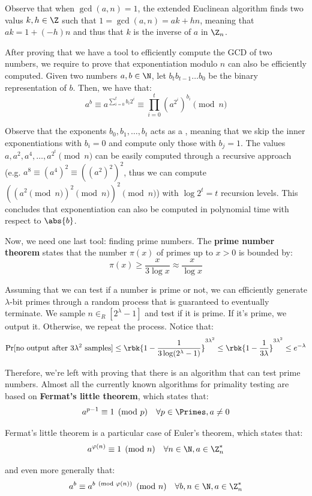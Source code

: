\documentclass[a4paper, 12pt]{report}
\begin{document}
    Observe that when $\gcd(a,n) = 1$, the extended Euclinean algorithm finds two valus $k,h \in \Z$ such that $1 = \gcd(a,n) = ak+hn$, meaning that $ak = 1+(-h)n$ and thus that $k$ is the inverse of $a$ in $\Z_n$.

    After proving that we have a tool to efficiently compute the GCD of two numbers, we require to prove that exponentiation modulo $n$ can also be efficiently computed. Given two numbers $a,b \in \N$, let $b_tb_{t-1}\ldots b_0$ be the binary representation of $b$. Then, we have that:
    \[a^b \equiv a^{\sum_{i = 0}^t b_i 2^i} \equiv \prod_{i = 0}^t (a^{2^i})^{b_i} \pmod n\]

    Observe that the exponents $b_0, b_1, \ldots, b_t$ acts as a , meaning that we skip the inner exponentiations with $b_i = 0$ and compute only those with $b_j = 1$. The values $a, a^2, a^4, \ldots, a^{2^t} \pmod n$ can be easily computed through a recursive approach (e.g. $a^8 \equiv (a^4)^2 \equiv ((a^2)^2)^2$, thus we can compute $((a^2 \pmod n)^2 \pmod n)^2 \pmod n$) with $\log 2^t = t$ recursion levels. This concludes that exponentiation can also be computed in polynomial time with respect to $\abs{b}$.

    Now, we need one last tool: finding prime numbers. The \textbf{prime number theorem} states that the number $\pi(x)$ of primes up to $x > 0$ is bounded by:
    \[\pi(x) \geq \frac{x}{3 \log x} \approx \frac{x}{\log x}\] 

    Assuming that we can test if a number is prime or not, we can efficiently generate $\lambda$-bit primes through a random process that is guaranteed to eventually terminate. We sample $n \in_R [2^\lambda-1]$ and test if it is prime. If it's prime, we output it. Otherwise, we repeat the process. Notice that:
    \[\Pr[\text{no output after $3\lambda^2$ samples}] \leq \rbk{1-\frac{1}{3\log(2^\lambda -1)}}^{3\lambda^2} \leq \rbk{1-\frac{1}{3\lambda}}^{3\lambda^2} \leq e^{-\lambda}\]

    Therefore, we're left with proving that there is an algorithm that can test prime numbers. Almost all the currently known algorithms for primality testing are based on \textbf{Fermat's little theorem}, which states that:
    \[a^{p-1} \equiv 1 \pmod p \quad \forall p \in \Primes, a \neq 0\]

    Fermat's little theorem is a particular case of Euler's theorem, which states that:
    \[a^{\varphi(n)} \equiv 1 \pmod n \quad \forall n \in \N, a \in \Z_n^*\]

    and even more generally that:
    \[a^{b} \equiv a^{b \pmod {\varphi(n)}} \pmod n \quad \forall b,n \in \N, a \in \Z_n^*\]
    
\end{document}
